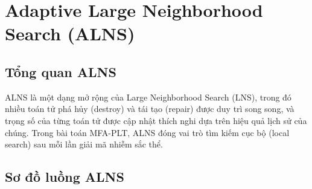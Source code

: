 
\section{Adaptive Large Neighborhood Search (ALNS)}

\subsection{Tổng quan ALNS}

ALNS là một dạng mở rộng của Large Neighborhood Search (LNS), trong đó nhiều toán tử phá hủy (destroy) và tái tạo (repair) được duy trì song song, và trọng số của từng toán tử được cập nhật thích nghi dựa trên hiệu quả lịch sử của chúng. Trong bài toán MFA-PLT, ALNS đóng vai trò tìm kiếm cục bộ (local search) sau mỗi lần giải mã nhiễm sắc thể.

\subsection{Sơ đồ luồng ALNS}

